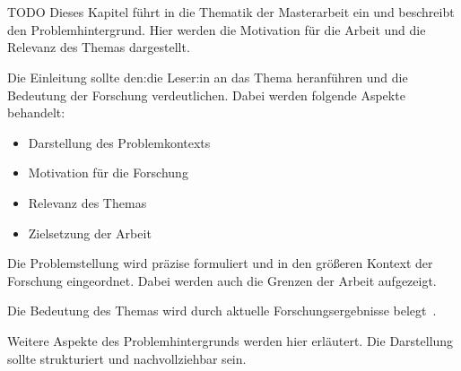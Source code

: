 
\chapter{\introductionLabel}\label{cha:introduction}

TODO 
Dieses Kapitel führt in die Thematik der Masterarbeit ein und beschreibt den Problemhintergrund. 
Hier werden die Motivation für die Arbeit und die Relevanz des Themas dargestellt.

Die Einleitung sollte den:die Leser:in an das Thema heranführen und die Bedeutung der Forschung verdeutlichen. 
Dabei werden folgende Aspekte behandelt:

\begin{itemize}[leftmargin=0.63cm, label=\textbullet]
    \item Darstellung des Problemkontexts
    \item Motivation für die Forschung
    \item Relevanz des Themas
    \item Zielsetzung der Arbeit
\end{itemize}

Die Problemstellung wird präzise formuliert und in den größeren Kontext der Forschung eingeordnet. 
Dabei werden auch die Grenzen der Arbeit aufgezeigt.

Die Bedeutung des Themas wird durch aktuelle Forschungsergebnisse belegt~\cite{beispiel2024}.

Weitere Aspekte des Problemhintergrunds werden hier erläutert. Die Darstellung sollte strukturiert und nachvollziehbar sein.

